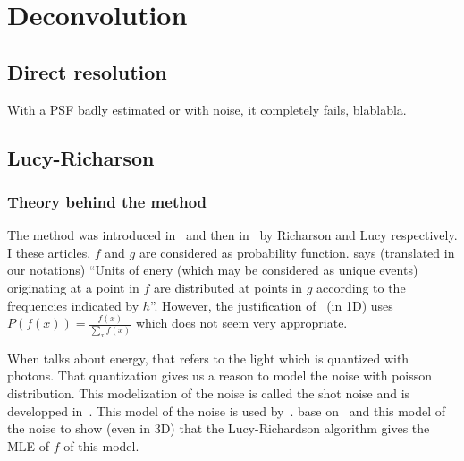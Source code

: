 \section{Deconvolution}
\subsection{Direct resolution}
With a PSF badly estimated or with noise,
it completely fails, blablabla.

\subsection{Lucy-Richarson}
\subsubsection{Theory behind the method}
The method was introduced in~\cite{richardson1972bayesian} and
then in~\cite{lucy1974iterative} by Richarson and Lucy respectively.
I these articles, $f$ and $g$ are considered as probability function.
\cite{richardson1972bayesian} says (translated in our notations)
``Units of enery (which may be considered as unique events)
originating at a point in $f$ are distributed at points in $g$
according to the frequencies indicated by $h$''.
However, the justification of~\cite{richardson1972bayesian} (in 1D) uses
$P(f(x)) = \frac{f(x)}{\sum_x f(x)}$ which does not seem
very appropriate.

When \cite{richardson1972bayesian} talks about energy,
that refers to the light which is quantized with photons.
That quantization gives us a reason to model the noise with
poisson distribution.
This modelization of the noise is called the shot noise and
is developped in~\cite{blanter2000shot}.
This model of the noise is used by~\cite{hebert1989generalized}.
\cite{temerinac2010tile} base on~\cite{hebert1989generalized}
and this model of the noise to show (even in 3D)
that the Lucy-Richardson algorithm gives the MLE of $f$ of this
model.

